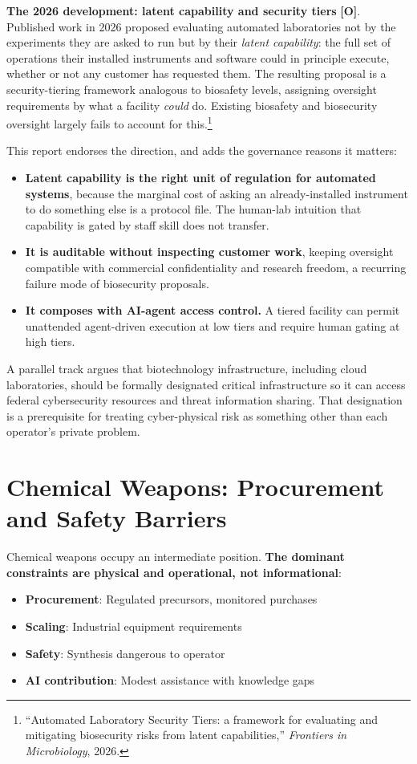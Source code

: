 \documentclass[11pt,letterpaper]{article}
\begin{document}
\textbf{The 2026 development: latent capability and security tiers} \textbf{[O]}. Published work in 2026 proposed evaluating automated laboratories not by the experiments they are asked to run but by their \textit{latent capability}: the full set of operations their installed instruments and software could in principle execute, whether or not any customer has requested them. The resulting proposal is a security-tiering framework analogous to biosafety levels, assigning oversight requirements by what a facility \textit{could} do. Existing biosafety and biosecurity oversight largely fails to account for this.\footnote{``Automated Laboratory Security Tiers: a framework for evaluating and mitigating biosecurity risks from latent capabilities,'' \textit{Frontiers in Microbiology}, 2026.}

This report endorses the direction, and adds the governance reasons it matters:
\begin{itemize}[nosep]
  \item \textbf{Latent capability is the right unit of regulation for automated systems}, because the marginal cost of asking an already-installed instrument to do something else is a protocol file. The human-lab intuition that capability is gated by staff skill does not transfer.
  \item \textbf{It is auditable without inspecting customer work}, keeping oversight compatible with commercial confidentiality and research freedom, a recurring failure mode of biosecurity proposals.
  \item \textbf{It composes with AI-agent access control.} A tiered facility can permit unattended agent-driven execution at low tiers and require human gating at high tiers.
\end{itemize}

A parallel track argues that biotechnology infrastructure, including cloud laboratories, should be formally designated critical infrastructure so it can access federal cybersecurity resources and threat information sharing. That designation is a prerequisite for treating cyber-physical risk as something other than each operator's private problem.

\section{Chemical Weapons: Procurement and Safety Barriers}

Chemical weapons occupy an intermediate position. \textbf{The dominant constraints are physical and operational, not informational}:
\begin{itemize}
  \item \textbf{Procurement}: Regulated precursors, monitored purchases
  \item \textbf{Scaling}: Industrial equipment requirements
  \item \textbf{Safety}: Synthesis dangerous to operator
  \item \textbf{AI contribution}: Modest assistance with knowledge gaps
\end{itemize}
\end{document}
